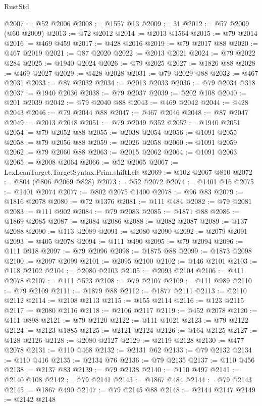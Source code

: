 \begin{lexlean}{RustStd}
\begin{coremodule}
@2007 := @52 @2006
@2008 := @1557 @13
@2009 := 31
@2012 := @57 @2009 (@60 @2009)
@2013 := @72 @2012
@2014 := @2013 @1564
@2015 := @79 @2014
@2016 := @469 @459
@2017 := @428 @2016
@2019 := @79 @2017 @88
@2020 := @467 @2019
@2021 := @87 @2020
@2022 := @2013 @2021
@2024 := @79 @2022 @284
@2025 := @1940 @2024
@2026 := @79 @2025
@2027 := @1826 @88
@2028 := @469 @2027
@2029 := @428 @2028
@2031 := @79 @2029 @88
@2032 := @467 @2031
@2033 := @87 @2032
@2034 := @2013 @2033
@2036 := @79 @2034 @318
@2037 := @1940 @2036
@2038 := @79 @2037
@2039 := @202 @108
@2040 := @201 @2039
@2042 := @79 @2040 @88
@2043 := @469 @2042
@2044 := @428 @2043
@2046 := @79 @2044 @88
@2047 := @467 @2046
@2048 := @87 @2047
@2049 := @2013 @2048
@2051 := @79 @2049 @352
@2052 := @1940 @2051
@2054 := @79 @2052 @88
@2055 := @2038 @2054
@2056 := @1091 @2055
@2058 := @79 @2056 @88
@2059 := @2026 @2058
@2060 := @1091 @2059
@2062 := @79 @2060 @88
@2063 := @2015 @2062
@2064 := @1091 @2063
@2065 := @2008 @2064
@2066 := @52 @2065
@2067 := LexLeanTarget.TargetSyntax.Prim.shiftLeft
@2069 := @102 @2067 @810
@2072 := @804 (@806 @2069 @828)
@2073 := @52 @2072
@2074 := @1401 @16
@2075 := @1401 @2074
@2077 := @802 @2075 @1400
@2078 := @96 @83
@2079 := @1816 @2078
@2080 := @72 @1376
@2081 := @111 @484
@2082 := @79 @2081
@2083 := @111 @902
@2084 := @79 @2083
@2085 := @1871 @88
@2086 := @1869 @2085
@2087 := @2084 @2086
@2088 := @2082 @2087
@2089 := @137 @2088
@2090 := @113 @2089
@2091 := @2080 @2090
@2092 := @2079 @2091
@2093 := @405 @2078
@2094 := @111 @490
@2095 := @79 @2094
@2096 := @111 @918
@2097 := @79 @2096
@2098 := @1875 @88
@2099 := @1873 @2098
@2100 := @2097 @2099
@2101 := @2095 @2100
@2102 := @146 @2101
@2103 := @118 @2102
@2104 := @2080 @2103
@2105 := @2093 @2104
@2106 := @411 @2078
@2107 := @111 @523
@2108 := @79 @2107
@2109 := @111 @989
@2110 := @79 @2109
@2111 := @1879 @88
@2112 := @1877 @2111
@2113 := @2110 @2112
@2114 := @2108 @2113
@2115 := @155 @2114
@2116 := @123 @2115
@2117 := @2080 @2116
@2118 := @2106 @2117
@2119 := @452 @2078
@2120 := @111 @898
@2121 := @79 @2120
@2122 := @111 @1021
@2123 := @79 @2122
@2124 := @2123 @1885
@2125 := @2121 @2124
@2126 := @164 @2125
@2127 := @128 @2126
@2128 := @2080 @2127
@2129 := @2119 @2128
@2130 := @477 @2078
@2131 := @110 @468
@2132 := @2131 @62
@2133 := @79 @2132
@2134 := @110 @416
@2135 := @2134 @76
@2136 := @79 @2135
@2137 := @110 @456
@2138 := @2137 @83
@2139 := @79 @2138
@2140 := @110 @497
@2141 := @2140 @108
@2142 := @79 @2141
@2143 := @1867 @484
@2144 := @79 @2143
@2145 := @1867 @490
@2147 := @79 @2145 @88
@2148 := @2144 @2147
@2149 := @2142 @2148

\end{coremodule}
\end{lexlean}
